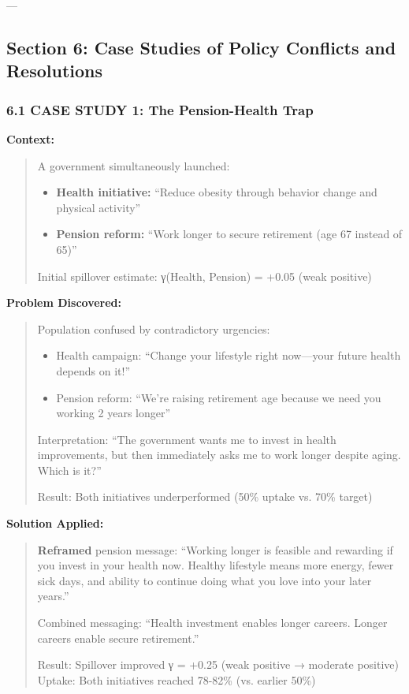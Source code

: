 ---


\subsection*{Section 6: Case Studies of Policy Conflicts and Resolutions}

\subsubsection*{6.1 CASE STUDY 1: The Pension-Health Trap}

\textbf{Context:}
\begin{quote}
A government simultaneously launched:
\begin{itemize}[nosep]
\item \textbf{Health initiative:} ``Reduce obesity through behavior change and physical activity''
\item \textbf{Pension reform:} ``Work longer to secure retirement (age 67 instead of 65)''
\end{itemize}

Initial spillover estimate: γ(Health, Pension) = +0.05 (weak positive)
\end{quote}

\textbf{Problem Discovered:}
\begin{quote}
Population confused by contradictory urgencies:
\begin{itemize}[nosep]
\item Health campaign: ``Change your lifestyle right now---your future health depends on it!''
\item Pension reform: ``We're raising retirement age because we need you working 2 years longer''
\end{itemize}

Interpretation: ``The government wants me to invest in health improvements, but then immediately asks me to work longer despite aging. Which is it?''

Result: Both initiatives underperformed (50\% uptake vs. 70\% target)
\end{quote}

\textbf{Solution Applied:}
\begin{quote}
\textbf{Reframed} pension message: ``Working longer is feasible and rewarding if you invest in your health now. Healthy lifestyle means more energy, fewer sick days, and ability to continue doing what you love into your later years.''

Combined messaging: ``Health investment enables longer careers. Longer careers enable secure retirement.''

Result: Spillover improved γ = +0.25 (weak positive → moderate positive)
Uptake: Both initiatives reached 78-82\% (vs. earlier 50\%)
\end{quote}

